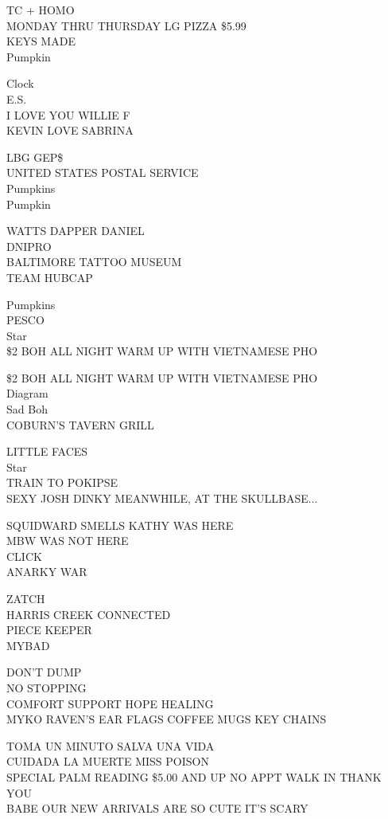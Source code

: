 \documentclass[10pt,letterpaper]{article}
\begin{document}
TC + HOMO\\
MONDAY THRU THURSDAY LG PIZZA \$5.99\\
KEYS MADE\\
Pumpkin

Clock\\
E.S.\\
I LOVE YOU WILLIE F\\
KEVIN LOVE SABRINA

LBG GEP\$\\
UNITED STATES POSTAL SERVICE\\
Pumpkins\\
Pumpkin

WATTS DAPPER DANIEL\\
DNIPRO\\
BALTIMORE TATTOO MUSEUM\\
TEAM HUBCAP

Pumpkins\\
PESCO\\
Star\\
\$2 BOH ALL NIGHT WARM UP WITH VIETNAMESE PHO

\$2 BOH ALL NIGHT WARM UP WITH VIETNAMESE PHO\\
Diagram\\
Sad Boh\\
COBURN'S TAVERN GRILL

LITTLE FACES\\
Star\\
TRAIN TO POKIPSE\\
SEXY JOSH DINKY MEANWHILE, AT THE SKULLBASE...

SQUIDWARD SMELLS KATHY WAS HERE\\
MBW WAS NOT HERE\\
CLICK\\
ANARKY WAR

ZATCH\\
HARRIS CREEK CONNECTED\\
PIECE KEEPER\\
MYBAD

DON'T DUMP\\
NO STOPPING\\
COMFORT SUPPORT HOPE HEALING\\
MYKO RAVEN'S EAR FLAGS COFFEE MUGS KEY CHAINS

TOMA UN MINUTO SALVA UNA VIDA\\
CUIDADA LA MUERTE MISS POISON\\
SPECIAL PALM READING \$5.00 AND UP NO APPT WALK IN THANK YOU\\
BABE OUR NEW ARRIVALS ARE SO CUTE IT'S SCARY
\end{document}
